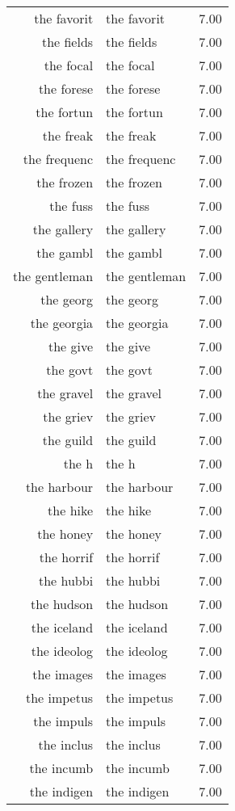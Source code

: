 \begin{table}[ht]
\begin{tabular}{rlr}
  the favorit & the favorit & 7.00 \\ 
  the fields & the fields & 7.00 \\ 
  the focal & the focal & 7.00 \\ 
  the forese & the forese & 7.00 \\ 
  the fortun & the fortun & 7.00 \\ 
  the freak & the freak & 7.00 \\ 
  the frequenc & the frequenc & 7.00 \\ 
  the frozen & the frozen & 7.00 \\ 
  the fuss & the fuss & 7.00 \\ 
  the gallery & the gallery & 7.00 \\ 
  the gambl & the gambl & 7.00 \\ 
  the gentleman & the gentleman & 7.00 \\ 
  the georg & the georg & 7.00 \\ 
  the georgia & the georgia & 7.00 \\ 
  the give & the give & 7.00 \\ 
  the govt & the govt & 7.00 \\ 
  the gravel & the gravel & 7.00 \\ 
  the griev & the griev & 7.00 \\ 
  the guild & the guild & 7.00 \\ 
  the h & the h & 7.00 \\ 
  the harbour & the harbour & 7.00 \\ 
  the hike & the hike & 7.00 \\ 
  the honey & the honey & 7.00 \\ 
  the horrif & the horrif & 7.00 \\ 
  the hubbi & the hubbi & 7.00 \\ 
  the hudson & the hudson & 7.00 \\ 
  the iceland & the iceland & 7.00 \\ 
  the ideolog & the ideolog & 7.00 \\ 
  the images & the images & 7.00 \\ 
  the impetus & the impetus & 7.00 \\ 
  the impuls & the impuls & 7.00 \\ 
  the inclus & the inclus & 7.00 \\ 
  the incumb & the incumb & 7.00 \\ 
  the indigen & the indigen & 7.00 \\ 

\end{tabular}
\end{table}
